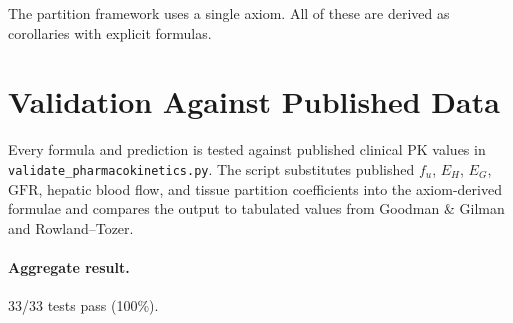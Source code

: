 \documentclass[twocolumn,10pt,a4paper]{article}
\theoremstyle{definition}
\theoremstyle{remark}
\begin{document}
The partition framework uses a single axiom. All of these are derived as corollaries with explicit formulas.

\section{Validation Against Published Data}

Every formula and prediction is tested against published clinical PK values in \texttt{validate\_pharmacokinetics.py}. The script substitutes published $f_u$, $E_H$, $E_G$, $\mathrm{GFR}$, hepatic blood flow, and tissue partition coefficients into the axiom-derived formulae and compares the output to tabulated values from Goodman \& Gilman and Rowland--Tozer.

\paragraph{Aggregate result.} 33/33 tests pass (100\%).
\end{document}
